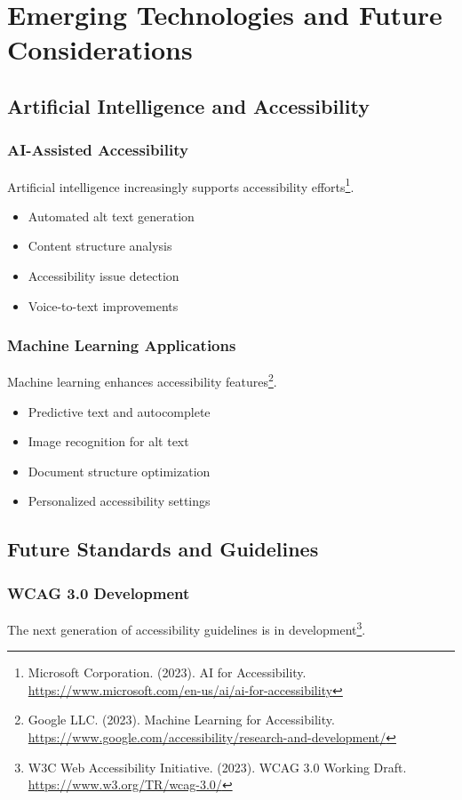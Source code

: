 \section{Emerging Technologies and Future Considerations}
\label{sec:emerging-tech}

\subsection{Artificial Intelligence and Accessibility}

\subsubsection{AI-Assisted Accessibility}
Artificial intelligence increasingly supports accessibility efforts\footnote{Microsoft Corporation. (2023). AI for Accessibility. \url{https://www.microsoft.com/en-us/ai/ai-for-accessibility}}.

\begin{itemize}
\item Automated alt text generation
\item Content structure analysis
\item Accessibility issue detection
\item Voice-to-text improvements
\end{itemize}

\subsubsection{Machine Learning Applications}
Machine learning enhances accessibility features\footnote{Google LLC. (2023). Machine Learning for Accessibility. \url{https://www.google.com/accessibility/research-and-development/}}.

\begin{itemize}
\item Predictive text and autocomplete
\item Image recognition for alt text
\item Document structure optimization
\item Personalized accessibility settings
\end{itemize}

\subsection{Future Standards and Guidelines}

\subsubsection{WCAG 3.0 Development}
The next generation of accessibility guidelines is in development\footnote{W3C Web Accessibility Initiative. (2023). WCAG 3.0 Working Draft. \url{https://www.w3.org/TR/wcag-3.0/}}.

